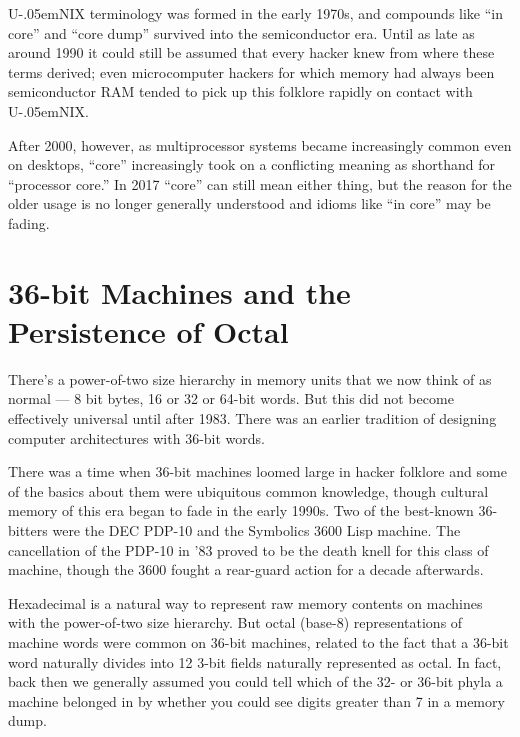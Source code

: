 \documentclass[12pt,letterpaper]{article}
\newcommand{\mc}{\small}
\newcommand{\acro}[1]{{\mc #1\spacefactor1000}}
\def\UNIX/{{\mc U\kern-.05emNIX\spacefactor1000}}%
\begin{document}
\UNIX/ terminology was formed in the early 1970s, and compounds like ``in core''
and ``core dump'' survived into the semiconductor era. Until as late as around
1990 it could still be assumed that every hacker knew from where these terms
derived; even microcomputer hackers for which memory had always been
semiconductor \acro{RAM} tended to pick up this folklore rapidly on contact with \UNIX/.

After 2000, however, as multiprocessor systems became increasingly common even
on desktops, ``core'' increasingly took on a conflicting meaning as shorthand for
``processor core.'' In 2017 ``core'' can still mean either thing, but the reason
for the older usage is no longer generally understood and idioms like ``in core''
may be fading.

\section{36-bit Machines and the Persistence of Octal}
There's a power-of-two size hierarchy in memory units that we now think of as
normal --- 8 bit bytes, 16 or 32 or 64-bit words. But this did not become
effectively universal until after 1983. There was an earlier tradition of
designing computer architectures with 36-bit words.

There was a time when 36-bit machines loomed large in hacker folklore and some
of the basics about them were ubiquitous common knowledge, though cultural
memory of this era began to fade in the early 1990s. Two of the best-known
36-bitters were the \acro{DEC PDP-10} and the Symbolics 3600 Lisp machine. The
cancellation of the \acro{PDP-10} in '83 proved to be the death knell for this class
of machine, though the 3600 fought a rear-guard action for a decade afterwards.

Hexadecimal is a natural way to represent raw memory contents on machines with
the power-of-two size hierarchy. But octal (base-8) representations of machine
words were common on 36-bit machines, related to the fact that a 36-bit word
naturally divides into 12 3-bit fields naturally represented as octal. In fact,
back then we generally assumed you could tell which of the 32- or 36-bit phyla
a machine belonged in by whether you could see digits greater than 7 in a
memory dump.
\end{document}
